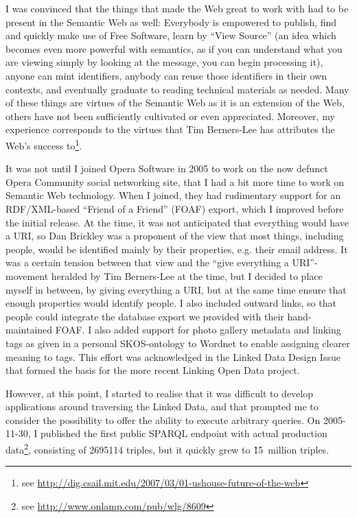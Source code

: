 I was convinced that the things that made the Web great to work with
had to be present in the Semantic Web as well: Everybody is empowered
to publish, find and quickly make use of Free Software, learn by
``View Source'' (an idea which becomes even more powerful with
semantics, as if you can understand what you are viewing simply by
looking at the message, you can begin processing it), anyone can mint
identifiers, anybody can reuse those identifiers in their own
contexts, and eventually graduate to reading technical materials as
needed. Many of these things are virtues of the Semantic Web as it is
an extension of the Web, others have not been sufficiently cultivated
or even appreciated. Moreover, my experience corresponds to the
virtues that Tim Berners-Lee has attributes the Web's success
to\footnote{see
  \url{http://dig.csail.mit.edu/2007/03/01-ushouse-future-of-the-web}}.

It was not until I joined Opera Software in 2005 to work on the now
defunct Opera Community social networking site, that I had a bit more
time to work on Semantic Web technology. When I joined, they had
rudimentary support for an RDF/XML-based ``Friend of a Friend'' (FOAF)
export, which I improved before the initial release. At the time, it
was not anticipated that everything would have a URI, so Dan Brickley
was a proponent of the view that most things, including people, would
be identified mainly by their properties, e.g. their email address. It
was a certain tension between that view and the ``give everything a
URI''-movement heralded by Tim Berners-Lee at the time, but I decided
to place myself in between, by giving everything a URI, but at the
same time ensure that enough properties would identify people. I also
included outward links, so that people could integrate the database
export we provided with their hand-maintained FOAF. I also added
support for photo gallery metadata and linking tags as given in a
personal SKOS-ontology to Wordnet to enable assigning clearer meaning
to tags. This effort was acknowledged in the Linked Data Design
Issue\cite{linkeddataissue} that formed the basis for the more recent Linking
Open Data project.

However, at this point, I started to realise that it was difficult to
develop applications around traversing the Linked Data, and that
prompted me to consider the possibility to offer the ability to
execute arbitrary queries. On 2005-11-30, I published the first public
SPARQL endpoint with actual production data\footnote{see
  \url{http://www.onlamp.com/pub/wlg/8609}}, consisting of 2695114
triples, but it quickly grew to \~15~million triples.

